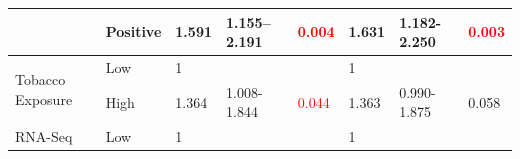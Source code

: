 \documentclass[jpm,article,submit,moreauthors,pdftex]{Definitions/mdpi}
\begin{document}
\begin{table}[hp]
{\begin{tabular}{|l|l|l|l|l|l|l|l|}
\cline{2-8}
                                        & Positive                                                                            & 1.591                                                                          & 1.155–2.191                                                                   & \textcolor{red}{0.004}                                                        & 1.631                                                                          & 1.182-2.250                                                                   & \textcolor{red}{0.003}                                                         \\ 
\hline
\multirow{2}{*}{Tobacco Exposure}       & {\cellcolor[rgb]{0.62,0.812,0.878}}Low                                              & {\cellcolor[rgb]{0.62,0.812,0.878}}1                                           & {\cellcolor[rgb]{0.62,0.812,0.878}}                                           & {\cellcolor[rgb]{0.62,0.812,0.878}}                                           & {\cellcolor[rgb]{0.62,0.812,0.878}}1                                           & {\cellcolor[rgb]{0.62,0.812,0.878}}                                           & {\cellcolor[rgb]{0.62,0.812,0.878}}                                            \\ 
\cline{2-8}
                                        & High                                                                                & 1.364                                                                          & 1.008-1.844                                                                   & \textcolor{red}{0.044}                                                        & 1.363                                                                          & 0.990-1.875                                                                   & 0.058                                                                          \\ 
\hline
\multirow{2}{*}{RNA-Seq}                & {\cellcolor[rgb]{0.62,0.812,0.878}}Low                                              & {\cellcolor[rgb]{0.62,0.812,0.878}}1                                           & {\cellcolor[rgb]{0.62,0.812,0.878}}                                           & {\cellcolor[rgb]{0.62,0.812,0.878}}                                           & {\cellcolor[rgb]{0.62,0.812,0.878}}1                                           & {\cellcolor[rgb]{0.62,0.812,0.878}}                                           & {\cellcolor[rgb]{0.62,0.812,0.878}}                                            \\ 

\end{tabular}}
\end{table}
\end{document}
